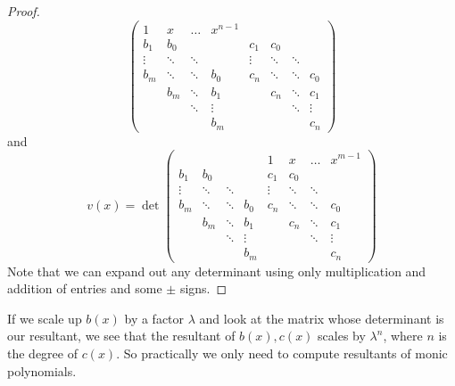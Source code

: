 \begin{proof}
\[\begin{pmatrix}
1      & x      & \dots  & x^{n-1}  \\
b_1    & b_0    &        &        & c_1    & c_0 \\
\vdots & \ddots & \ddots &        & \vdots & \ddots & \ddots & \\
b_m    & \ddots & \ddots  & b_0    & c_n    & \ddots & \ddots  & c_0 \\
       & b_m    & \ddots  & b_1    &        & c_n    & \ddots  & c_1 \\
       &        & \ddots & \vdots &        &        & \ddots & \vdots \\
       &        &        & b_m    &        &        &        & c_n
\end{pmatrix}
\]
and
\[
v(x)
=
\det
\begin{pmatrix}
       &        &        &        & 1      & x      & \dots  & x^{m-1}  \\
b_1    & b_0    &        &        & c_1    & c_0 \\
\vdots & \ddots & \ddots &        & \vdots & \ddots & \ddots & \\
b_m    & \ddots & \ddots  & b_0    & c_n    & \ddots & \ddots  & c_0 \\
       & b_m    & \ddots  & b_1    &        & c_n    & \ddots  & c_1 \\
       &        & \ddots & \vdots &        &        & \ddots & \vdots \\
       &        &        & b_m    &        &        &        & c_n
\end{pmatrix}
\]
Note that we can expand out any determinant using only multiplication and addition of entries and some \(\pm\) signs.
\end{proof}



If we scale up \(b(x)\) by a factor \(\lambda\) and look at the matrix whose determinant is our resultant, we see that the resultant of \(b(x),c(x)\) scales by \(\lambda^n\), where \(n\) is the degree of \(c(x)\).
So practically we only need to compute resultants of monic polynomials.


